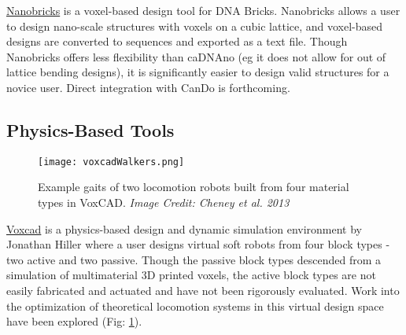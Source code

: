 {\href{http://yin.hms.harvard.edu/bricks/try/}{Nanobricks} is a voxel-based design tool for DNA Bricks.  Nanobricks allows a user to design nano-scale structures with voxels on a cubic lattice, and voxel-based designs are converted to sequences and exported as a text file.  Though Nanobricks offers less flexibility than caDNAno (eg it does not allow for out of lattice bending designs), it is significantly easier to design valid structures for a novice user.  Direct integration with CanDo is forthcoming.
\\

\subsection{Physics-Based Tools}

\begin{figure}
  \texttt{[image: voxcadWalkers.png]}
  \caption{Example gaits of two locomotion robots built from four material types in VoxCAD\cite{Cheney2013b}.  \textit{Image Credit: Cheney et al. 2013}}
  \label{fig:voxcadWalkers}
\end{figure}

\href{http://www.voxcad.com/}{Voxcad} is a physics-based design and dynamic simulation environment by Jonathan Hiller where a user designs virtual soft robots from four block types - two active and two passive\cite{Hiller2014a}.  Though the passive block types descended from a simulation of multimaterial 3D printed voxels, the active block types are not easily fabricated and actuated\cite{Hiller2012} and have not been rigorously evaluated.  Work into the optimization of theoretical locomotion systems in this virtual design space have been explored (Fig: \ref{fig:voxcadWalkers})\cite{Cheney2013b}\cite{Cheney2013}\cite{Cheney2015}.

}